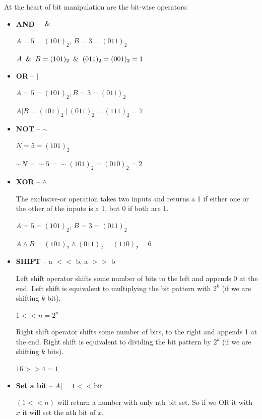 \documentclass{article}
\begin{document}
    At the heart of bit manipulation are the bit-wise operators: 
    \begin{itemize}
        \item \textbf{AND} -- $\And$ 
        
        $A = 5 = (101)_2$, $B = 3 = (011)_2$

        $A \And B = (101)_2  \And (011)_2 = (001)_2 = 1$
        
        \item \textbf{OR} -- $\vert$ 
        
        $A = 5 = (101)_2 , B = 3 = (011)_2$
        
        $A \vert B = (101)_2 \  \vert \ (011)_2 = (111)_2 = 7$
        
        \item\textbf{NOT} -- $\sim$ 
        
        $N = 5 = (101)_2$
        
        $\sim N = \sim 5 = \sim (101)_2 = (010)_2 = 2$
        
        \item \textbf{XOR} -- $\wedge$ 
        
        The exclusive-or operation takes two inputs and returns a 1 if either one or the other of the inputs is a 1, but 0 if both are 1.
        
        $A = 5 = (101)_2$, $B = 3 = (011)_2$
        
        $A \wedge B = (101)_2 \wedge (011)_2 = (110)_2 = 6$
        
        \item  \textbf{SHIFT} -- a $<<$ b, a $>>$ b
        
        Left shift operator shifts some number of bits to the left and appends 0 at the end. Left shift is equivalent to multiplying the bit pattern with $2^k$ (if we are shifting $k$ bit).
        
        $1 << n = 2^n$
        
        Right shift operator shifts some number of bits, to the right and appends 1 at the end. Right shift is equivalent to dividing the bit pattern by $2^k$ (if we are shifting $k$ bits).
        
        $16 >> 4 = 1$
        
        \item \textbf{Set a bit}  -- $A \vert= 1 <<  \text{bit}$
        
        $(1 << n)$ will return a number with only nth bit set. So if we OR it with $x$ it will set the nth bit of $x$.
        

\end{itemize}
\end{document}
